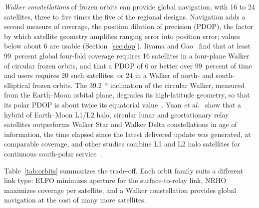 \documentclass{IEEEoj}
\begin{document}
\emph{Walker constellations} of frozen orbits can provide global navigation, with 16 to 24 satellites, three to five times the five of the regional designs. Navigation adds a second measure of coverage, the position dilution of precision (PDOP), the factor by which satellite geometry amplifies ranging error into position error; values below about 6 are usable (Section~\ref{sec:dop}). Iiyama and Gao~\cite{iiyama_lans} find that at least 99~percent global four-fold coverage requires 16 satellites in a four-plane Walker of circular frozen orbits, and that a PDOP of 6 or better over 99~percent of time and users requires 20 such satellites, or 24 in a Walker of north- and south-elliptical frozen orbits. The \SI{39.2}{\degree} inclination of the circular Walker, measured from the Earth--Moon orbital plane, degrades its high-latitude geometry, so that its polar PDOP is about twice its equatorial value~\cite{iiyama_lans}. Yuan \emph{et al.}~\cite{yuan_hybrid_cislunar} show that a hybrid of Earth--Moon L1/L2 halo, circular lunar and geostationary relay satellites outperforms Walker Star and Walker Delta constellations in age of information, the time elapsed since the latest delivered update was generated, at comparable coverage, and other studies combine L1 and L2 halo satellites for continuous south-polar service~\cite{mdpi_orbital_infra}.

Table~\ref{tab:orbits} summarizes the trade-off. Each orbit family suits a different link type: ELFO minimizes aperture for the surface-to-relay link, NRHO maximizes coverage per satellite, and a Walker constellation provides global navigation at the cost of many more satellites.
\end{document}
